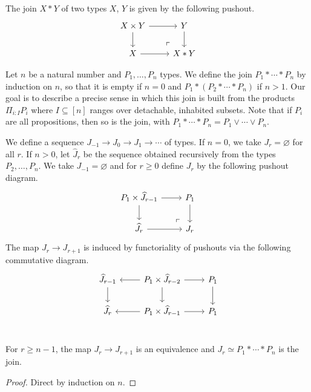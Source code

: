 \begin{definition}
The join $X * Y$ of two types $X$, $Y$ is given by the following pushout.
\[
\begin{tikzcd}
X \times Y \arrow[r] \arrow[d]
	& Y \arrow[d] \\
	X \arrow[r] &
	X * Y 
	\arrow[ul, phantom, "\ulcorner" , very near start]
\end{tikzcd}
\]
\end{definition}

Let $n$ be a natural number and $P_1, \ldots, P_n$ types.
We define the join $P_1 * \cdots * P_n$ by induction on $n$,
so that it is empty if $n = 0$ 
and $P_1 * (P_2 * \cdots * P_n)$ if $n > 1$.
Our goal is to describe a precise sense in which
this join is built from the products
$\Pi_{i : I} P_i$ where $I \subseteq [n]$ ranges over detachable,
inhabited subsets.
Note that if $P_i$ are all propositions, then so is the join, with
$P_1 * \cdots * P_n = P_1 \vee \cdots \vee P_n$.

\begin{definition}
We define a sequence $J_{-1} \to J_0 \to J_1 \to \cdots$ of types.
If $n = 0$, we take $J_r = \varnothing$ for all $r$.
If $n > 0$, let $\widehat J_r$ be the sequence obtained recursively from
the types $P_2, \ldots, P_n$.
We take $J_{-1} = \varnothing$ and for $r \ge 0$ define $J_r$ by the following
pushout diagram.
\[
\begin{tikzcd}
P_1 \times \widehat J_{r-1} \arrow[r] \arrow[d]
	& P_1 \arrow[d] \\
	\widehat J_r \arrow[r] &
	J_r 
	\arrow[ul, phantom, "\ulcorner" , very near start]
\end{tikzcd}
\]
The map $J_r \to J_{r+1}$ is induced by functoriality of pushouts via the following
commutative diagram.
\[
\begin{tikzcd}
	\widehat J_{r-1} \arrow[d] &
	P_1 \times \widehat J_{r-2} \arrow[l] \arrow[d] \arrow[r] &
	P_1 \arrow[d] \\
	\widehat J_r &
	P_1 \times \widehat J_{r-1} \arrow[l] \arrow[r] &
	P_1 \\
\end{tikzcd}
\]
\end{definition}

\begin{lemma}\label{eventually-join}
For $r \ge n-1$, the map $J_r \to J_{r+1}$ is an equivalence and
$J_r \simeq P_1 * \cdots * P_n$ is the join.
\end{lemma}
\begin{proof}
Direct by induction on $n$.
\end{proof}


